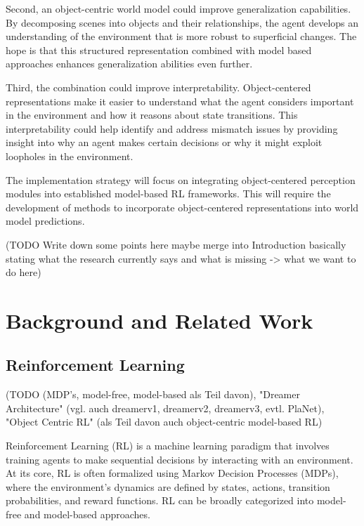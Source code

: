 \documentclass[
	english,
	ruledheaders=section,
	class=report,
	thesis={type=master},
	accentcolor=9c,
	custommargins=true,
	marginpar=false,
	parskip=half-,
	fontsize=11pt,
]{tudapub}
\begin{document}
Second, an object-centric world model could improve generalization capabilities. By decomposing scenes into objects and their relationships, the agent develops an understanding of the environment that is more robust to
 superficial changes. The hope is that this structured representation combined with model based approaches enhances generalization abilities even further.

Third, the combination could improve interpretability. Object-centered representations make it easier to understand what the agent considers important in the environment and how it reasons 
about state transitions. This interpretability could help identify and address mismatch issues by providing insight into why an agent makes certain decisions or why it might exploit loopholes in the environment.

The implementation strategy will focus on integrating object-centered perception modules into established model-based RL frameworks. This will require the development of methods to incorporate
 object-centered representations into world model predictions.

(TODO Write down some points here maybe merge into Introduction basically stating what the research currently says and what is missing -> what we want to do here)

\chapter{Background and Related Work}
\label{chap:background}

\section{Reinforcement Learning}
\label{sec:reinforcement_learning}

(TODO  (MDP's, model-free, model-based als Teil davon), "Dreamer Architecture" (vgl. auch dreamerv1, dreamerv2, dreamerv3, evtl. PlaNet), "Object Centric RL" (als Teil davon auch object-centric model-based RL) 

Reinforcement Learning (RL) is a machine learning paradigm that involves training agents to make sequential 
decisions by interacting with an environment. At its core, RL is often formalized using Markov Decision Processes
 (MDPs), where the environment's dynamics are defined by states, actions, transition probabilities, and reward
 functions. RL can be broadly categorized into model-free and model-based approaches.
\end{document}
